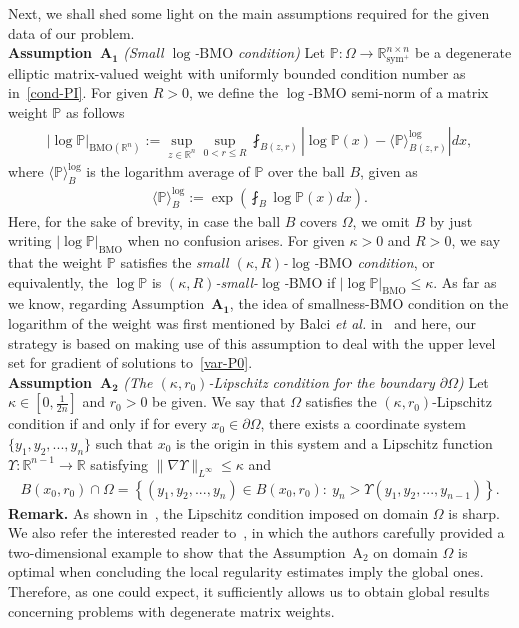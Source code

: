 \documentclass[a4paper, 11pt]{article}
\begin{document}
Next, we shall shed some light on the main assumptions required for the given data of our problem. \\
\textbf{Assumption~$\mathbf{A_1}$} \textit{(Small $\log$-$\mathrm{BMO}$ condition)} Let $\mathbb{P}: \Omega \to \mathbb{R}^{n \times n}_{\mathrm{sym}^+}$ be a degenerate elliptic matrix-valued weight with uniformly bounded condition number as in~\eqref{cond-PI}. For given $R>0$, we define the $\log$-$\mathrm{BMO}$ semi-norm of a matrix weight $\mathbb{P}$  as follows
\begin{align}\label{BMO-norm}
|\log \mathbb{P}|_{\mathrm{BMO}(\mathbb{R}^n)} :=\sup_{z \in \mathbb{R}^n}{\sup_{0<r \le R} \fint_{B(z,r)} |\log \mathbb{P}(x) - \langle \mathbb{P}\rangle_{B(z,r)}^{\log}| dx}, 
\end{align}
where $\langle \mathbb{P}\rangle_B^{\log}$ is the logarithm average of $\mathbb{P}$ over the ball $B$, given as
\begin{align}\label{log-PI}
\langle \mathbb{P}\rangle_B^{\log} := \exp \left(\fint_B \log \mathbb{P}(x) dx\right).
\end{align}
Here, for the sake of brevity, in case the ball $B$ covers $\Omega$, we omit $B$ by just writing $|\log \mathbb{P}|_{\mathrm{BMO}}$ when no confusion arises. For given $\kappa>0$ and $R>0$, we say that the weight $\mathbb{P}$ satisfies the \emph{small $(\kappa,R)$-$\log$-$\mathrm{BMO}$ condition}, or equivalently, the $\log\mathbb{P}$ is \emph{$(\kappa,R)$-small-$\log$-$\mathrm{BMO}$} if $|\log \mathbb{P}|_{\mathrm{BMO}} \le \kappa$. As far as we know, regarding Assumption~$\mathbf{A_1}$, the idea of smallness-BMO condition on the logarithm of the weight was first mentioned by Balci \emph{et al.} in~\cite{BDGN2022} and here, our strategy is based on making use of this assumption to deal with the upper level set for gradient of solutions to~\eqref{var-P0}. \\[5pt]
\textbf{Assumption~$\mathbf{A_2}$} \textit{(The $(\kappa,r_0)$-Lipschitz condition for the boundary $\partial\Omega$)} Let $\kappa \in \left[0,\frac{1}{2n}\right]$ and $r_0>0$ be given. We say that $\Omega$ satisfies the $(\kappa,r_0)$-Lipschitz condition if and only if for every $x_0 \in \partial \Omega$, there exists a coordinate system $\{y_1, y_2,...,y_n\}$ such that $x_0$ is the origin in this system and a Lipschitz function $\Upsilon: \mathbb{R}^{n-1} \to \mathbb{R}$ satisfying $\|\nabla \Upsilon\|_{L^{\infty}} \le \kappa$ and
\begin{align*}
B(x_0,r_0) \cap \Omega = \left\{(y_1, y_2,..., y_n) \in B(x_0,r_0): \ y_n > \Upsilon(y_1,y_2,...,y_{n-1}) \right\}.
\end{align*}
{\bf Remark. } As shown in~\cite{BBDL2023}, the Lipschitz condition imposed on domain $\Omega$ is sharp. We also refer the interested reader to~\cite[Example 4.1]{BBDL2023}, in which the authors carefully provided a two-dimensional example to show that the Assumption~$\mathrm{A}_2$ on domain $\Omega$ is optimal when concluding the local regularity estimates imply the global ones. Therefore, as one could expect, it sufficiently allows us to obtain global results concerning problems with degenerate matrix weights.\\
\end{document}
